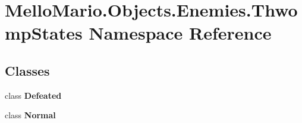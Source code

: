 \section{Mello\+Mario.\+Objects.\+Enemies.\+Thwomp\+States Namespace Reference}
\label{namespaceMelloMario_1_1Objects_1_1Enemies_1_1ThwompStates}
\subsection*{Classes}
\begin{DoxyCompactItemize}
\item 
class \textbf{ Defeated}
\item 
class \textbf{ Normal}
\end{DoxyCompactItemize}
